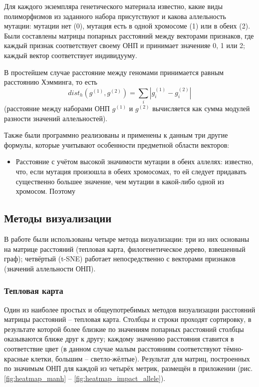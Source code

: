 \documentclass[main.tex]{subfiles}
\begin{document}
Для каждого экземпляра генетического материала известно, какие виды полиморфизмов из заданного набора присутствуют и какова аллельность мутации: мутации нет (0), мутация есть в одной хромосоме (1) или в обеих (2). Были составлены матрицы попарных расстояний между векторами признаков, где каждый признак соответствует своему ОНП и принимает значенияе 0, 1 или 2; каждый вектор соответствует индивидууму.

В простейшем случае расстояние между геномами принимается равным расстоянию Хэмминга, то есть
\begin{equation}\label{eq:hamming}
    dist_h(g^{(1)}, g^{(2)}) = \sum_{i} | g^{(1)}_i - g^{(2)}_i |
\end{equation}
(расстояние между наборами ОНП $g^{(1)}$ и $g^{(2)}$ вычисляется как сумма модулей разности значений аллельностей).

Также были программно реализованы и применены к данным три другие формулы, которые учитывают особенности предметной области векторов:

\begin{itemize}
    \item Расстояние с учётом высокой значимости мутации в обеих аллелях: известно, что, если мутация произошла в обеих хромосомах, то ей следует придавать существенно большее значение, чем мутации в какой-либо одной из хромосом. Поэтому
\end{itemize}

\subsection{Методы визуализации}

В работе были использованы четыре метода визуализации: три из них основаны на матрице расстояний (тепловая карта, филогенетическое дерево, взвешенный граф); четвёртый (t-SNE) работает непосредственно с векторами признаков (значений аллельности ОНП).

\subsubsection{Тепловая карта}

Один из наиболее простых и общеупотребимых методов визуализации расстояний матрицы расстояний -- тепловая карта. Столбцы и строки проходят сортировку, в результате которой более близкие по значениям попарных расстояний столбцы оказываются ближе друг к другу; каждому значению расстояния ставится в соответствие цвет (в данном случае малым расстояниям соответствуют тёмно-красные клетки, большим -- светло-жёлтые). Результат для матриц, построенных по значимым ОНП для каждой из четырёх метрик, размещён в приложении (рис. \ref{fig:heatmap_manh} -- \ref{fig:heatmap_impact_allele}).
\end{document}
